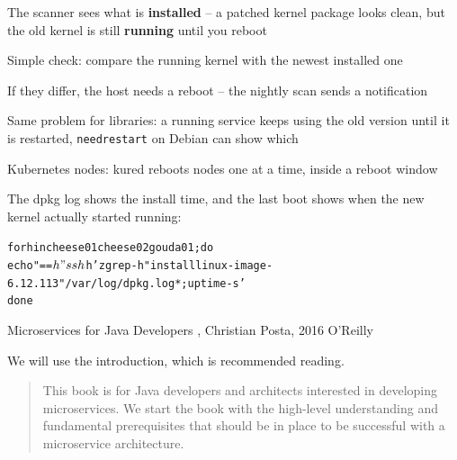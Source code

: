 \documentclass[Screen16to9,17pt]{foils}
\begin{document}
\begin{list2}
\item The scanner sees what is {\bf installed} -- a patched kernel package looks clean, but the old kernel is still {\bf running} until you reboot
\item Simple check: compare the running kernel with the newest installed one
\item If they differ, the host needs a reboot -- the nightly scan sends a notification
\item Same problem for libraries: a running service keeps using the old version until it is restarted, \verb+needrestart+ on Debian can show which
\item Kubernetes nodes: kured reboots nodes one at a time, inside a reboot window
\end{list2}

The dpkg log shows the install time, and the last boot shows when the new kernel actually started running:
\begin{alltt}\footnotesize
for h in cheese01 cheese02 gouda01; do
  echo "== $h"
  ssh $h 'zgrep -h " install linux-image-6.12.113" /var/log/dpkg.log*; uptime -s'
done
\end{alltt}

\breakdance









Microservices for Java Developers , Christian Posta, 2016 O’Reilly\\

We will use the introduction, which is recommended reading.


\begin{quote}
This book is for Java developers and architects interested in developing microservices. We start the book with the high-level understanding and fundamental prerequisites that should be in place to be successful with a microservice architecture.
\end{quote}
\end{document}
